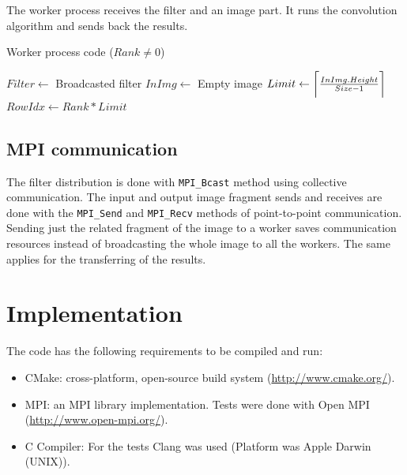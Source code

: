 \documentclass[11pt,a4paper,oneside]{article}
\DeclarePairedDelimiter{\ceil}{\lceil}{\rceil}
\begin{document}
The worker process receives the filter and an image part. It runs the
convolution algorithm and sends back the results.

\begin{algorithm}
\caption{Worker process code ($Rank \ne 0$)}
\begin{algorithmic}[1]
\State $Filter \gets$ Broadcasted filter
\State $InImg \gets$ Empty image
\State $Limit \gets \ceil[\bigg]{\frac{InImg.Height}{Size - 1}}$
\State $RowIdx \gets Rank * Limit$
\State {}
\State {}
\State {}
\end{algorithmic}
\end{algorithm}

\subsection{MPI communication}

The filter distribution is done with \texttt{MPI\_Bcast} method using
collective communication. The input and output image fragment sends and
receives are done with the \texttt{MPI\_Send} and \texttt{MPI\_Recv} methods of
point-to-point communication. Sending just the related fragment of the image to
a worker saves communication resources instead of broadcasting the whole image
to all the workers. The same applies for the transferring of the results.



\section{Implementation}

The code has the following requirements to be compiled and run:

\begin{itemize}
    \item CMake: cross-platform, open-source build system
        (\url{http://www.cmake.org/}).
    \item MPI: an MPI library implementation. Tests were done with Open MPI
        (\url{http://www.open-mpi.org/}).
    \item C Compiler: For the tests Clang was used (Platform was Apple Darwin
        (UNIX)).
\end{itemize}
\end{document}
